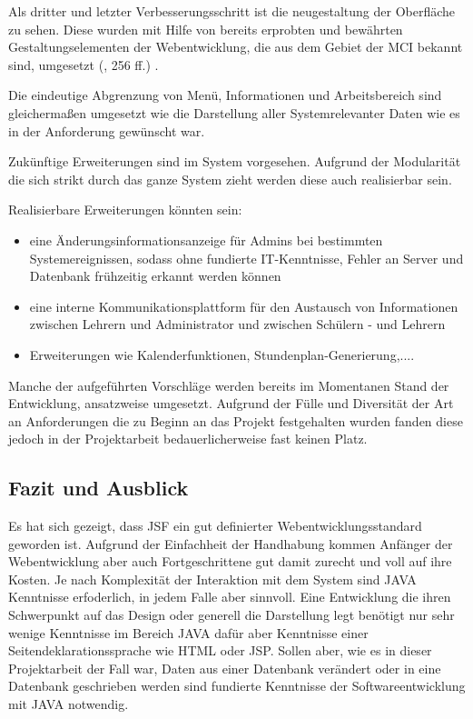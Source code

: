 Als dritter und letzter Verbesserungsschritt ist die neugestaltung der Oberfläche zu sehen. Diese wurden mit Hilfe von bereits erprobten und bewährten Gestaltungselementen der Webentwicklung, die aus dem Gebiet der \ac{MCI} bekannt sind, umgesetzt (\cite{DahmM-GdMCI}, 256 ff.)  .

Die eindeutige Abgrenzung von Menü, Informationen und Arbeitsbereich sind gleichermaßen umgesetzt wie die Darstellung aller Systemrelevanter Daten wie es in der Anforderung gewünscht war.

Zukünftige Erweiterungen sind im System vorgesehen. Aufgrund der Modularität die sich strikt durch das ganze System zieht werden diese auch realisierbar sein.

Realisierbare Erweiterungen könnten sein:
\begin{itemize}
  \item eine Änderungsinformationsanzeige für Admins bei bestimmten Systemereignissen, sodass ohne fundierte \ac{IT}-Kenntnisse, Fehler an Server und Datenbank frühzeitig erkannt werden können
  \item eine interne Kommunikationsplattform für den Austausch von Informationen zwischen Lehrern und Administrator und zwischen Schülern - und Lehrern  
  \item Erweiterungen wie Kalenderfunktionen, Stundenplan-Generierung,....
\end{itemize}
  
Manche der aufgeführten Vorschläge werden bereits im Momentanen Stand der Entwicklung, ansatzweise umgesetzt. 
Aufgrund der Fülle und Diversität der Art an Anforderungen die zu Beginn an das Projekt festgehalten wurden fanden diese jedoch in der Projektarbeit bedauerlicherweise fast keinen Platz.

\subsection{Fazit und Ausblick}

Es hat sich gezeigt, dass \ac{JSF} ein gut definierter Webentwicklungsstandard geworden ist.
Aufgrund der Einfachheit der Handhabung kommen Anfänger der Webentwicklung aber auch Fortgeschrittene gut damit zurecht und voll auf ihre Kosten.
Je nach Komplexität der Interaktion mit dem System sind JAVA Kenntnisse erfoderlich, in jedem Falle aber sinnvoll. 
Eine Entwicklung die ihren Schwerpunkt auf das Design oder generell die Darstellung legt benötigt nur sehr wenige Kenntnisse im Bereich JAVA dafür aber Kenntnisse einer Seitendeklarationssprache wie HTML oder JSP.
Sollen aber, wie es in dieser Projektarbeit der Fall war, Daten aus einer Datenbank verändert oder in eine Datenbank geschrieben werden sind fundierte Kenntnisse der Softwareentwicklung mit JAVA notwendig.

